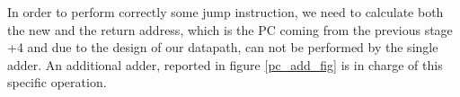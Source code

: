 In order to perform correctly some jump instruction, we need to calculate both 
the new and the return address, which is the PC coming from the previous stage 
+4 and due to the design of our datapath, can not be performed by the single 
adder. An additional adder, reported in figure \ref{pc_add_fig} is in charge of 
this specific operation.






